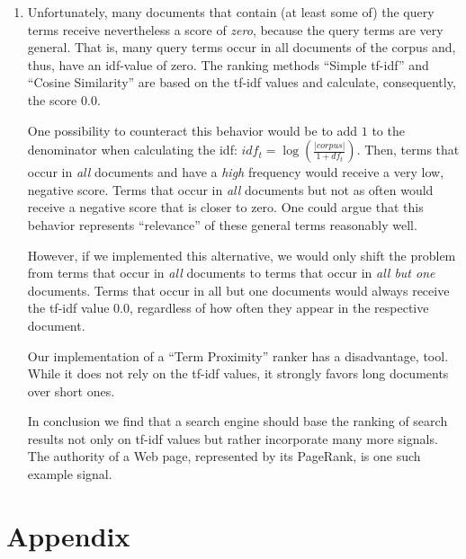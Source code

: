 \documentclass[a4paper,11pt,oneside]{book}
\begin{document}
\begin{enumerate}
\item \label{commentary} Unfortunately, many documents that contain (at least some of) the query terms receive nevertheless a score of \emph{zero}, because the query terms are very general. That is, many query terms occur in all documents of the corpus and, thus, have an idf-value of zero. The ranking methods ``Simple tf-idf'' and ``Cosine Similarity'' are based on the tf-idf values and calculate, consequently, the score $0.0$. 
					
					One possibility to counteract this behavior would be to add $1$ to the denominator when calculating the idf: $idf_t = \log(\frac{|corpus|}{1+df_t})$. Then, terms that occur in \emph{all} documents and have a \emph{high} frequency would receive a very low, negative score. Terms that occur in \emph{all} documents but not as often would receive a negative score that is closer to zero. One could argue that this behavior represents ``relevance'' of these general terms reasonably well.
					
					However, if we implemented this alternative, we would only shift the problem from terms that occur in \emph{all} documents to terms that occur in \emph{all but one} documents. Terms that occur in all but one documents would always receive the tf-idf value 0.0, regardless of how often they appear in the respective document.
					
					Our implementation of a ``Term Proximity'' ranker has a disadvantage, tool. While it does not rely on the tf-idf values, it strongly favors long documents over short ones. 
					
					In conclusion we find that a search engine should base the ranking of search results not only on tf-idf values but rather incorporate many more signals. The authority of a Web page, represented by its PageRank, is one such example signal.
					

\end{enumerate}











\chapter{Appendix}
\end{document}
